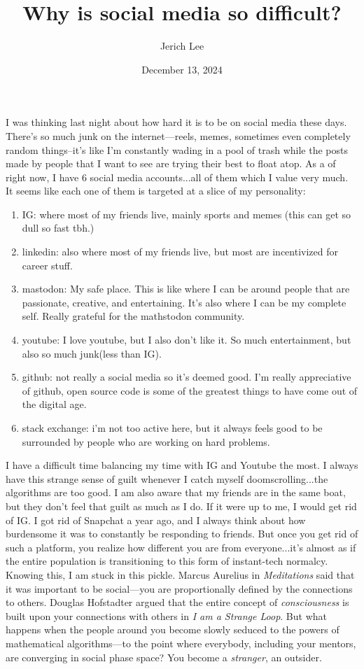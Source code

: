\documentclass[12pt]{article}
\title{Why is social media so difficult?}
\author{Jerich Lee}
\date{December 13, 2024}
\theoremstyle{definition} %
\theoremstyle{plain} %
\begin{document}
\maketitle
I was thinking last night about how hard it is to be on social media these days. There's so much junk on the internet—reels, memes, sometimes even completely random things–it's like I'm constantly wading in a pool of trash while the posts made by people that I want to see are trying their best
to float atop. As a of right now, I have 6 social media accounts...all of them which I value very much. It seems like each one of them is targeted at a slice of my personality:
\begin{enumerate}
    \item IG: where most of my friends live, mainly sports and memes (this can get so dull so fast tbh.)
    \item linkedin: also where most of my friends live, but most are incentivized for career stuff.
    \item mastodon: My safe place. This is like where I can be around people that are passionate, creative, and entertaining. It's also where I can be my complete self. Really grateful for the mathstodon community.
    \item youtube: I love youtube, but I also don't like it. So much entertainment, but also so much junk(less than IG). 
    \item github: not really a social media so it's deemed good. I'm really appreciative of github, open source code is some of the greatest things to have come out of the digital age.
    \item stack exchange: i'm not too active here, but it always feels good to be surrounded by people who are working on hard problems.
\end{enumerate}
I have a difficult time balancing my time with IG and Youtube the most. I always have this strange sense of guilt whenever I catch myself doomscrolling...the algorithms are too good. I am also aware that my friends are in the same boat, but they don't feel that guilt as much as I do.
If it were up to me, I would get rid of IG. I got rid of Snapchat a year ago, and I always think about how burdensome it was to constantly be responding to friends. But once you get rid of such a platform, you realize how different you are from everyone...it's almost as if the entire population is transitioning to this form of instant-tech normalcy. 
\\
Knowing this, I am stuck in this pickle. Marcus Aurelius in \emph{Meditations} said that it was important to be social—you are proportionally defined by the connections to others. Douglas Hofstadter argued that the entire concept of \emph{consciousness} is built upon your connections with others in \emph{I am a Strange Loop}. But what happens when the people around you become slowly seduced to the powers of mathematical algorithms—to the point where everybody, including your mentors, are converging in social phase space? You become a \emph{stranger}, an outsider. 
\end{document}
